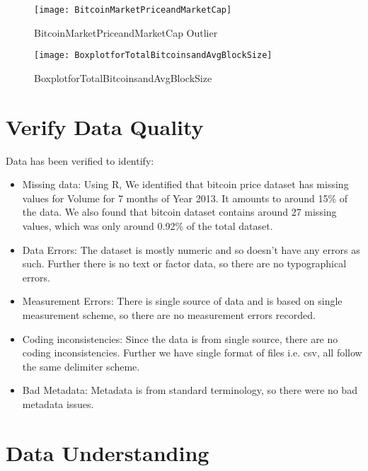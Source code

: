 \documentclass{article}
\begin{document}
\begin{itemize}
\begin{figure}
    \centering
    \texttt{[image: BitcoinMarketPriceandMarketCap]}
    \caption{BitcoinMarketPriceandMarketCap Outlier}
    \label{fig:my_label}
\end{figure}


\begin{figure}
    \centering
    \texttt{[image: BoxplotforTotalBitcoinsandAvgBlockSize]}
    \caption{BoxplotforTotalBitcoinsandAvgBlockSize}
    \label{fig:my_label}
\end{figure}


\end{itemize}


\section{Verify Data Quality}

Data has been verified to identify:

\begin{itemize}
\item 
Missing data: Using R, We identified that bitcoin price dataset has missing values for Volume for 7 months of Year 2013. It amounts to around 15\% of the data.
We also found that bitcoin dataset contains around 27 missing values, which was only around 0.92\% of the total dataset.

\item
Data Errors: The dataset is mostly numeric and so doesn't have any errors as such. Further there is no
text or factor data, so there are no typographical errors.

\item 
Measurement Errors: There is single source of data and is based on single measurement scheme, so there are no measurement errors recorded.

\item 
Coding inconsistencies: Since the data is from single source, there are no coding inconsistencies. Further we have single format of files i.e. csv, all follow the same delimiter scheme.

\item
Bad Metadata: Metadata is from standard terminology, so there were no bad metadata issues.
    
\end{itemize}

\section{Data Understanding}
\end{document}
